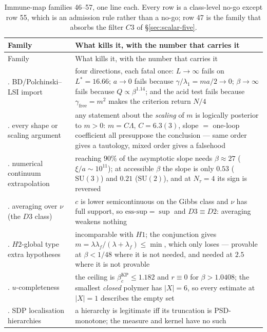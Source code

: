\footnotesize
\begin{longtable}{@{}>{\raggedright\arraybackslash}p{3.35cm}
  >{\raggedright\arraybackslash}p{11.05cm}@{}}
\caption{Immune-map families 46--57, one line each. Every row is a class-level no-go \LN{} except
row 55, which is an admission rule rather than a no-go; row 47 is the family that absorbs the
filter $C3$ of \S\ref{sec:scalar-five}.}\label{tab:scalar-fam}\\
\toprule
Family & What kills it, with the number that carries it\\
\midrule
\endfirsthead
\toprule
Family & What kills it, with the number that carries it\\
\midrule
\endhead
\bottomrule
\endlastfoot
46. BD/Polchinski--LSI import &
four directions, each fatal once: $L\to\infty$ fails on $L^*=16.66$; $a\to0$ fails because
$\gamma/\lambda_1=ma/2\to0$; $\beta\to\infty$ fails because $Q\propto\beta^{1.14}$; and the acid
test fails because $\gamma_{\mathrm{free}}=m^2$ makes the criterion return $N/4$\\
47. every shape or scaling argument &
any statement about the \emph{scaling} of $m$ is logically posterior to $m>0$: $m=C\Lambda$,
$C=6.3(3)$, slope $=$ one-loop coefficient all presuppose the conclusion --- same order gives a
tautology, mixed order gives a falsehood\\
48. numerical continuum extrapolation &
reaching $90\%$ of the asymptotic slope needs $\beta\approx27$ ($\xi/a\sim10^{11}$); at accessible
$\beta$ the slope is only $0.53$ ($\mathrm{SU}(3)$) and $0.21$ ($\mathrm{SU}(2)$), and at
$N_\tau=4$ its sign is reversed\\
49. averaging over $\nu$ (the $D3$ class) &
$c$ is lower semicontinuous on the Gibbs class and $\nu$ has full support, so
$\mathrm{ess}$-$\mathrm{sup}=\sup$ and $D3\equiv D2$: averaging weakens nothing\\
50. $H2$-global type extra hypotheses &
incomparable with $H1$; the conjunction gives $m=\lambda\lambda_f/(\lambda+\lambda_f)\le\min$, which
only loses --- provable at $\beta<1/48$ where it is not needed, and needed at $2.5$ where it is not
provable\\
51. $u$-completeness &
the ceiling is $\beta_c^{\mathrm{KP}}\le1.182$ and $r\equiv0$ for $\beta>1.0408$; the smallest
\emph{closed} polymer has $\lvert X\rvert=6$, so every estimate at $\lvert X\rvert=1$ describes the
empty set\\
52. SDP localisation hierarchies &
a hierarchy is legitimate iff its truncation is PSD-monotone; the measure and kernel have no such

\end{longtable}
